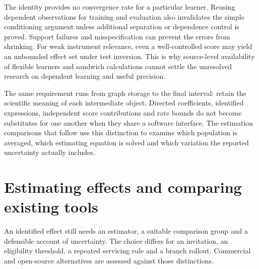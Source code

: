 The identity provides no convergence rate for a particular learner. Reusing
dependent observations for training and evaluation also invalidates the simple
conditioning argument unless additional separation or dependence control is
proved. Support failures and misspecification can prevent the errors from
shrinking. For weak instrument relevance, even a well-controlled score may
yield an unbounded effect set under test inversion. This is why source-level
availability of flexible learners and sandwich calculations cannot settle
the unresolved research on dependent learning and useful precision.


The same requirement runs from graph storage to the final interval: retain
the scientific meaning of each intermediate object. Directed coefficients,
identified expressions, independent score contributions and rate bounds do
not become substitutes for one another when they share a software interface.
The estimation comparisons that follow use this distinction to examine which
population is averaged, which estimating equation is solved and which
variation the reported uncertainty actually includes.



\part{Estimating effects and comparing existing tools}
\label{reading:part-effects}
An identified effect still needs an estimator, a suitable comparison group
and a defensible account of uncertainty. The choice differs for an invitation,
an eligibility threshold, a repeated servicing rule and a branch rollout.
Commercial and open-source alternatives are assessed against those distinctions.


